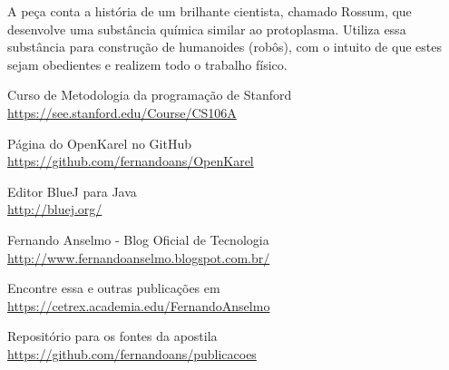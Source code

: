 \documentclass[a4paper,11pt]{article}
\begin{document}
\begin{thebibliography}{7}
  A peça conta a história de um brilhante cientista, chamado Rossum, que desenvolve uma substância química similar ao protoplasma. Utiliza essa substância para construção de humanoides (robôs), com o intuito de que estes sejam obedientes e realizem todo o trabalho físico.

  Curso de Metodologia da programação de Stanford \\
  \url{https://see.stanford.edu/Course/CS106A}
  
  Página do OpenKarel no GitHub \\
  \url{https://github.com/fernandoans/OpenKarel}
  
  Editor BlueJ para Java \\
  \url{http://bluej.org/}

  Fernando Anselmo - Blog Oficial de Tecnologia \\
  \url{http://www.fernandoanselmo.blogspot.com.br/}
  
  Encontre essa e outras publicações em \\
  \url{https://cetrex.academia.edu/FernandoAnselmo}

  Repositório para os fontes da apostila \\
  \url{https://github.com/fernandoans/publicacoes}
\end{thebibliography}
  
\end{document}
